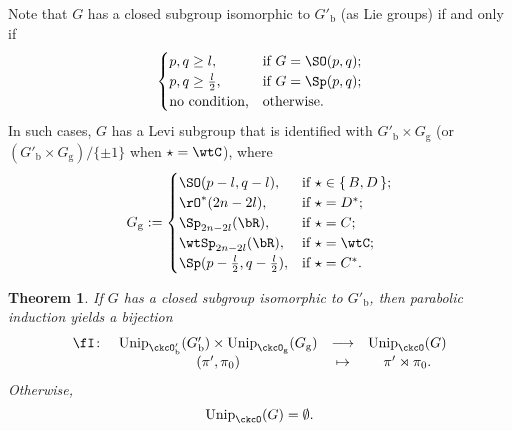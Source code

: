 \documentclass[12pt,a4paper]{amsart}
\newcommand{\oO}{\operatorname{O}}
\newcommand{\R}{\mathbb R}
\numberwithin{equation}{section}
\newtheorem{thm}{Theorem}[section]
\theoremstyle{remark}
\def\Unip{\mathrm{Unip}}
\def\Gpb{G'_{\mathrm b}}
\def\Gg{G_{\mathrm g}}
\begin{document}
Note that $G$ has a closed subgroup isomorphic to $\Gpb$ (as Lie groups) if and only if
\[
  \begin{cases}
    p,q\geq l, & \text{if $G = \SO(p,q)$};\\
    p,q\geq \frac{l}{2}, &  \text{if $G = \Sp(p,q)$};\\
    \text{no condition,} & \text{otherwise}.
  \end{cases}
\]
In such cases, $G$ has a Levi subgroup that is identified with $\Gpb\times \Gg$ (or   $(\Gpb\times \Gg)/\{\pm 1\} $ when $\star=\wtC$), where
\[
  \Gg :=
  \begin{cases}
    \SO(p-l,q-l), & \textrm{if $\star\in \set{B,D}$};\\
    \rO^{*}(2n-2l), &\textrm{if $\star = D^{*}$};\\
    \Sp_{2n-2l}(\bR), &\textrm{if $\star = C$};\\
    \wtSp_{2n-2l}(\bR), &\textrm{if $\star = \wtC$};\\
    \Sp(p-\frac{l}{2},q-\frac{l}{2}), &\textrm{if $\star = C^{*}$}.\\
  \end{cases}
\]

\begin{thm}\label{reduction}
 If  $G$ has a closed subgroup isomorphic to $\Gpb$, then parabolic induction yields
   a bijection
   \[
    \begin{array}{rccc}
      \fI\colon &   \Unip_{\ckcO'_{\mathrm b}}( G'_{\mathrm b})\times \Unip_{\ckcO_{\mathrm g}}( G_{\mathrm g})&         \longrightarrow &\Unip_{\ckcO }(G) \\
                &   (\pi',\pi_{0}) & \mapsto & \pi'\rtimes \pi_{0}.
    \end{array}
 \]
  Otherwise,
  \[
    \Unip_{\ckcO}(G)=\emptyset.
  \]
\end{thm}
\end{document}
